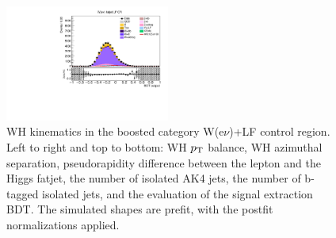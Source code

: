\begin{figure}[tbp]
\begin{center}
    \includegraphics[width=0.48\textwidth]{figures/wlnhbb2016/boosted/WenWHLightFlavorFJCR_bdtValue.pdf}
    \caption{WH kinematics in the boosted category W(e$\nu$)+LF control region.
    Left to right and top to bottom: WH $p_{\mathrm{T}}$ balance, WH azimuthal separation,
    pseudorapidity difference between the lepton and the Higgs fatjet,
    the number of isolated AK4 jets, the number of b-tagged isolated jets,
    and the evaluation of the signal extraction BDT.
    The simulated shapes are prefit, with the postfit normalizations applied.}
    \label{fig:boost_WenLF_WH}
  \end{center}
\end{figure}
\clearpage

